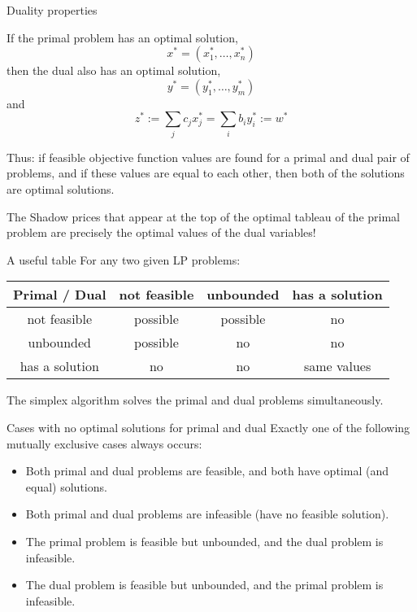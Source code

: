 \documentclass[c]{beamer}
\begin{document}
\begin{frame}[allowframebreaks]{Duality properties}


\begin{theorem}
  If the primal problem has an optimal solution,
  \[
  x^* = (x_1^*, \ldots, x_n^*)
  \]
  then the dual also has an optimal solution,
  \[
  y^* = (y_1^*, \ldots, y_m^*)
  \]
and
\[
z^* := \sum_j c_j x_j^* = \sum_i b_i y_i^* := w^*
\]

\end{theorem}
Thus: if feasible objective function values are found for a primal and dual pair of problems, and if these values are equal to each other, then both of the solutions are optimal solutions.

The Shadow prices that appear at the top of the optimal tableau of the primal problem are precisely the optimal values of the dual variables!
\end{frame}

\begin{frame}{A useful table}
  For any two given LP problems:
\begin{table}
  \begin{tabular}{c|c|c|c}
    Primal / Dual & not feasible & unbounded  & has a solution \\\hline
    not feasible & possible & possible & no \\\hline
    unbounded & possible & no & no \\\hline
    has a solution & no & no & same values\\
  \end{tabular}
\end{table}
The simplex algorithm solves the primal and dual problems simultaneously.
\end{frame}

\begin{frame}{Cases with no optimal solutions for primal and dual}
  Exactly one of the following mutually exclusive cases always occurs:
  \begin{itemize}
    \item Both primal and dual problems are feasible, and both have optimal (and equal) solutions.
    \item Both primal and dual problems are infeasible (have no feasible solution).
    \item The primal problem is feasible but unbounded, and the dual problem is infeasible.
    \item The dual problem is feasible but unbounded, and the primal problem is infeasible.
  \end{itemize}
\end{frame}
\end{document}
